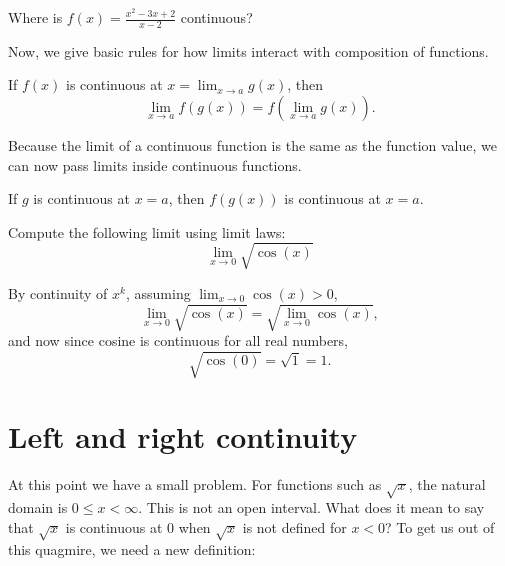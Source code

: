 \documentclass{ximera}
\begin{document}
\begin{question}
  Where is $f(x) = \frac{x^2-3x+2}{x-2}$ continuous?
  \begin{multipleChoice}
  \end{multipleChoice}
\end{question}


Now, we give basic rules for how limits interact with composition
of functions.

\begin{theorem}
  If $f(x)$ is continuous at $x = \displaystyle\lim_{x\to a} g(x)$, then
  \[
  \displaystyle\lim_{x\to a} f(g(x)) = f(\displaystyle\lim_{x\to a} g(x)).
  \]
\end{theorem}

Because the limit of a continuous function is the same as the function
value, we can now pass limits inside continuous functions.

\begin{corollary}
If $g$ is continuous at $x=a$, then $f(g(x))$ is continuous at $x=a$.
\end{corollary}

\begin{example}
  Compute the following limit using limit laws:
  \[
  \displaystyle\lim_{x \to 0} \sqrt{\cos(x)}
  \]
  \begin{explanation}
    By continuity of $x^k$, assuming $\displaystyle\lim_{x \to 0} \cos(x) >0$,
    \[
    \displaystyle\lim_{x \to 0} \sqrt{\cos(x)} = \sqrt{\displaystyle\lim_{x \to 0} \cos(x)},
    \]
    and now since cosine is continuous for all real numbers,
    \[
    \sqrt{\cos(0)} = \sqrt{1} = 1.
    \]
  \end{explanation}
\end{example}

\section{Left and right continuity}


At this point we have a small problem.  For functions such as
$\sqrt{x}$, the natural domain is $0\leq x <\infty$.  This is not an
open interval.  What does it mean to say that $\sqrt{x}$ is continuous
at $0$ when $\sqrt{x}$ is not defined for $x<0$? To get us out of this
quagmire, we need a new definition:
\end{document}
